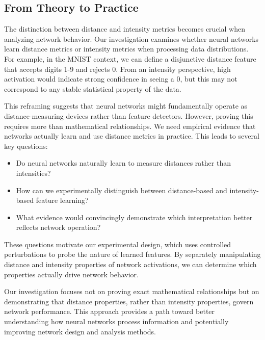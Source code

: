 \subsection{From Theory to Practice}

The distinction between distance and intensity metrics becomes crucial when analyzing network behavior. Our investigation examines whether neural networks learn distance metrics or intensity metrics when processing data distributions. For example, in the MNIST context, we can define a disjunctive distance feature that accepts digits 1-9 and rejects 0. From an intensity perspective, high activation would indicate strong confidence in seeing a 0, but this may not correspond to any stable statistical property of the data.

This reframing suggests that neural networks might fundamentally operate as distance-measuring devices rather than feature detectors. However, proving this requires more than mathematical relationships. We need empirical evidence that networks actually learn and use distance metrics in practice. This leads to several key questions:

\begin{itemize}
    \item Do neural networks naturally learn to measure distances rather than intensities?
    \item How can we experimentally distinguish between distance-based and intensity-based feature learning?
    \item What evidence would convincingly demonstrate which interpretation better reflects network operation?
\end{itemize}

These questions motivate our experimental design, which uses controlled perturbations to probe the nature of learned features. By separately manipulating distance and intensity properties of network activations, we can determine which properties actually drive network behavior.

Our investigation focuses not on proving exact mathematical relationships but on demonstrating that distance properties, rather than intensity properties, govern network performance. This approach provides a path toward better understanding how neural networks process information and potentially improving network design and analysis methods.